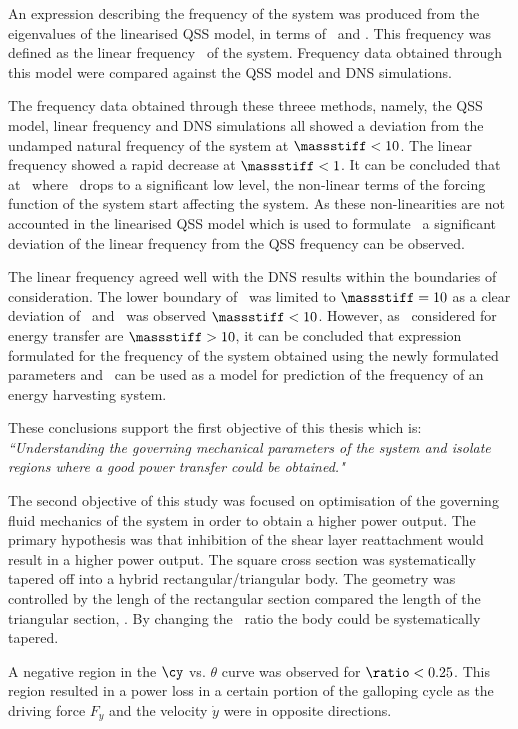  An expression describing the frequency of the system was produced from the eigenvalues of the linearised QSS model, in terms of \massstiff\ and \massdamp. This frequency was defined as the linear frequency \freqlin\ of the system. Frequency data obtained through this model were compared against the QSS model and DNS simulations.
  
 The frequency data obtained through these threee methods, namely, the QSS model, linear frequency and DNS simulations all showed a deviation from the undamped natural frequency of the system at $\massstiff<10$. The linear frequency showed a rapid decrease at $\massstiff<1$. It can be concluded that at \massstiff\, where \massstiff\ drops to a significant low level, the non-linear terms of the forcing function of the system start affecting the system. As these non-linearities are not accounted in the linearised QSS model which is used to formulate \freqlin\ a significant deviation of the linear frequency from the QSS frequency can be observed.
 
 The linear frequency agreed well with the DNS results within the boundaries of consideration. The lower boundary of \massstiff\ was limited to $\massstiff=10$ as a clear deviation of \freqlin\ and \freqdns\ was observed $\massstiff<10$. However, as \massstiff\ considered for energy transfer are $\massstiff>10$, it can be concluded that expression formulated for the frequency of the system obtained using the newly formulated parameters \massstiff and \massdamp\ can be used as a model for prediction of the frequency of an energy harvesting system.  
 
 
 These conclusions support the first objective of this thesis which is: \emph{``Understanding the governing mechanical parameters of the system and isolate regions where a good power transfer could be obtained."}
 
 The second objective of this study was focused on optimisation of the governing fluid mechanics of the system in order to obtain a higher power output. The primary hypothesis was that inhibition of the shear layer  reattachment would result in a higher power output. The square cross section was systematically tapered off into a hybrid rectangular/triangular body. The geometry was controlled by the lengh of the rectangular section compared the length of the triangular section, \ratio. By changing the \ratio\ ratio the body could be systematically tapered.
  
  A negative region in the $\cy$ vs. $\theta$ curve was observed for $\ratio<0.25$. This region resulted in a power loss in a certain portion of the galloping cycle as the driving force $F_y$ and the velocity $\dot{y}$ were in opposite directions.
 

